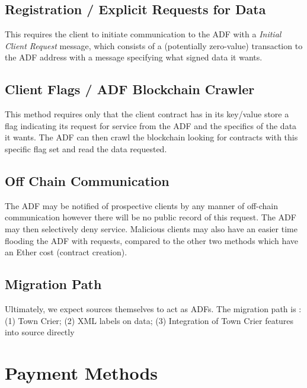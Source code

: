 \documentclass[letterpaper,twocolumn,10pt]{article}
\begin{document}
\subsection{Registration / Explicit Requests for Data}
	This requires the client to initiate communication to the ADF with a \emph{Initial Client Request} message, which consists of a (potentially zero-value) transaction to the ADF address with a message specifying what signed data it wants. 
	
\subsection{Client Flags / ADF Blockchain Crawler}
	This method requires only that the client contract has in its key/value store a flag indicating its request for service from the ADF and the specifics of the data it wants.  The ADF can then crawl the blockchain looking for contracts with this specific flag set and read the data requested.
	
\subsection{Off Chain Communication}
	The ADF may be notified of prospective clients by any manner of off-chain communication however there will be no public record of this request.  The ADF may then selectively deny service.  Malicious clients may also have an easier time flooding the ADF with requests, compared to the other two methods which have an Ether cost (contract creation).\\

\subsection{Migration Path}

Ultimately, we expect sources themselves to act as ADFs. The migration path is : (1) Town Crier; (2) XML labels on data; (3) Integration of Town Crier features into source directly

\section{Payment Methods}	
\end{document}
